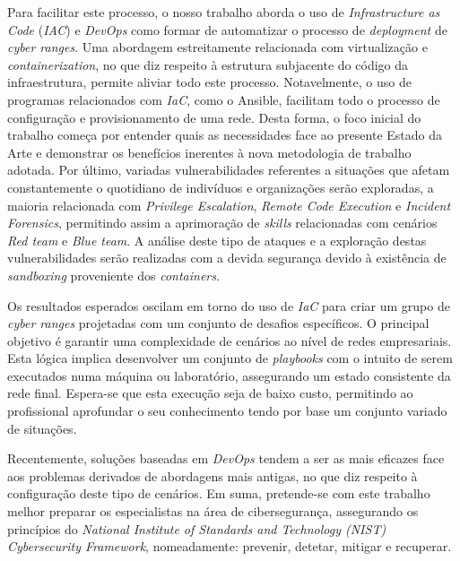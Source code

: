 Para facilitar este processo, o nosso trabalho aborda o uso de \textit{Infrastructure as Code} (\textit{IAC}) e \textit{DevOps} como formar de automatizar o processo de \textit{deployment} de \textit{cyber ranges}. Uma abordagem estreitamente relacionada com virtualização e \textit{containerization}, no que diz respeito à estrutura subjacente do código da infraestrutura, permite aliviar todo este processo. Notavelmente, o uso de programas relacionados com \textit{IaC}, como o Ansible, facilitam todo o processo de configuração e provisionamento de uma rede. Desta forma, o foco inicial do trabalho começa por entender quais as necessidades face ao presente Estado da Arte e demonstrar os benefícios inerentes à nova metodologia de trabalho adotada. Por último, variadas vulnerabilidades referentes a situações que afetam constantemente o quotidiano de indivíduos e organizações serão exploradas, a maioria relacionada com \textit{Privilege Escalation}, \textit{Remote Code Execution} e \textit{Incident Forensics}, permitindo assim a aprimoração de \textit{skills} relacionadas com cenários \textit{Red team} e \textit{Blue team}. A análise deste tipo de ataques e a exploração destas vulnerabilidades serão realizadas com a devida segurança devido à existência de \textit{sandboxing} proveniente dos \textit{containers}.

Os resultados esperados oscilam em torno do uso de \textit{IaC} para criar um grupo de \textit{cyber ranges} projetadas com um conjunto de desafios específicos. O principal objetivo é garantir uma complexidade de cenários ao nível de redes empresariais. Esta lógica implica desenvolver um conjunto de \textit{playbooks} com o intuito de serem executados numa máquina ou laboratório, assegurando um estado consistente da rede final. Espera-se que esta execução seja de baixo custo, permitindo ao profissional aprofundar o seu conhecimento tendo por base um conjunto variado de situações.

Recentemente, soluções baseadas em \textit{DevOps} tendem a ser as mais eficazes face aos problemas derivados de abordagens mais antigas, no que diz respeito à configuração deste tipo de cenários. Em suma, pretende-se com este trabalho melhor preparar os especialistas na área de cibersegurança, assegurando os princípios do \textit{National Institute of Standards and Technology (NIST) Cybersecurity Framework}, nomeadamente: prevenir, detetar, mitigar e recuperar. \\

